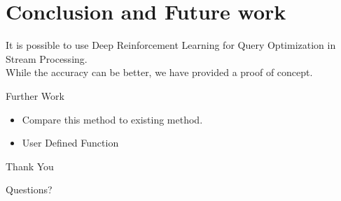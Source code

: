 \section{Conclusion and Future work}
\frame{\sectionpage}

\begin{frame}
    \begin{center}
        It is possible to use Deep Reinforcement Learning for Query Optimization in Stream Processing.\\
        While the accuracy can be better, we have provided a proof of concept.
    \end{center}
\end{frame}

\begin{frame}{Further Work}
    \begin{itemize}
        \item Compare this method to existing method.
        \item User Defined Function
    \end{itemize}
\end{frame}

\begin{frame}{Thank You}
    \begin{center}
        Questions?
    \end{center}
\end{frame}

